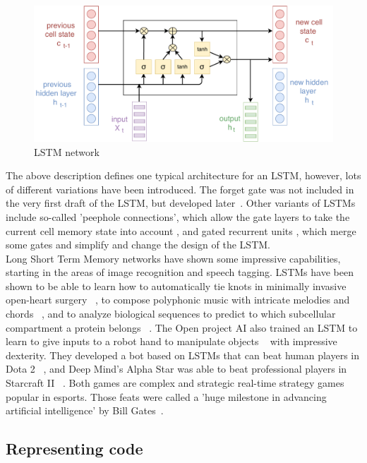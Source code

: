 \documentclass[
	a4paper,
	pagesize,
	pdftex,
	12pt,
	twoside, %
	BCOR=5mm, %
	ngerman,
	fleqn,
	final,
	]{scrartcl}
\begin{document}
\begin{figure}[ht]
	\centering
	\includegraphics[width=\linewidth]{img/LSTM}
	\caption{LSTM network}
	\label{fig:architectureLSTM}
\end{figure}

The above description defines one typical architecture for an LSTM, however, lots of different variations have been introduced. The forget gate was not included in the very first draft of the LSTM, but developed later~\cite{Gers.1999}. Other variants of LSTMs include so-called 'peephole connections', which allow the gate layers to take the current cell memory state into account \cite{Gers.2000}, and gated recurrent units \cite{Cho.2014}, which merge some gates and simplify and change the design of the LSTM. \\
Long Short Term Memory networks have shown some impressive capabilities, starting in the areas of image recognition and speech tagging. LSTMs have been shown to be able to learn how to automatically tie knots in minimally invasive open-heart surgery ~\cite{Mayer.2008}, to compose polyphonic music with intricate melodies and chords ~\cite{Kumar.2019}, and to analyze biological sequences to predict to which subcellular compartment a protein belongs ~\cite{Snderby.2015}. The Open project AI also trained an LSTM to learn to give inputs to a robot hand to manipulate objects ~\cite{OpenAIBlog.2018} with impressive dexterity. They developed a bot based on LSTMs that can beat human players in Dota 2 ~\cite{Rodriguez.2018}, and Deep Mind's Alpha Star was able to beat professional players in Starcraft II ~\cite{Stanford.2019}. Both games are complex and strategic real-time strategy games popular in esports. Those feats were called a 'huge milestone in advancing artificial intelligence' by Bill Gates~\cite{Gates2019}. 

\subsection{Representing code}
\end{document}
